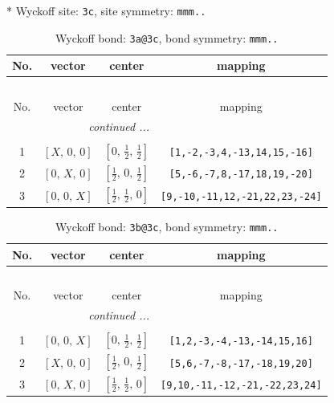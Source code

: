 \documentclass[fleqn,8pt]{jsarticle}
\begin{document}
* Wyckoff site: {\tt 3c}, site symmetry: {\tt mmm..}
\renewcommand{\arraystretch}{1.2}
\begin{longtable}{cccc}
\caption{Wyckoff bond: {\tt 3a@3c}, bond symmetry: {\tt mmm..}}
 \\
 \hline \hline
No. & vector & center & mapping \\ \hline \endfirsthead

\multicolumn{3}{l}{\tablename\ \thetable{}} \\
 \hline \hline
No. & vector & center & mapping \\ \hline \endhead

 \hline \hline
\multicolumn{3}{r}{\footnotesize\it continued ...} \\ \endfoot

 \hline \hline
\multicolumn{3}{r}{} \\ \endlastfoot

1 & $\left[ X,\, 0,\, 0 \right]$ & $\left[ 0,\, \frac{1}{2},\, \frac{1}{2} \right]$ & {\tt [1,-2,-3,4,-13,14,15,-16]} \\ \hline
2 & $\left[ 0,\, X,\, 0 \right]$ & $\left[ \frac{1}{2},\, 0,\, \frac{1}{2} \right]$ & {\tt [5,-6,-7,8,-17,18,19,-20]} \\ \hline
3 & $\left[ 0,\, 0,\, X \right]$ & $\left[ \frac{1}{2},\, \frac{1}{2},\, 0 \right]$ & {\tt [9,-10,-11,12,-21,22,23,-24]} \\
\end{longtable}
\renewcommand{\arraystretch}{1.2}
\begin{longtable}{cccc}
\caption{Wyckoff bond: {\tt 3b@3c}, bond symmetry: {\tt mmm..}}
 \\
 \hline \hline
No. & vector & center & mapping \\ \hline \endfirsthead

\multicolumn{3}{l}{\tablename\ \thetable{}} \\
 \hline \hline
No. & vector & center & mapping \\ \hline \endhead

 \hline \hline
\multicolumn{3}{r}{\footnotesize\it continued ...} \\ \endfoot

 \hline \hline
\multicolumn{3}{r}{} \\ \endlastfoot

1 & $\left[ 0,\, 0,\, X \right]$ & $\left[ 0,\, \frac{1}{2},\, \frac{1}{2} \right]$ & {\tt [1,2,-3,-4,-13,-14,15,16]} \\ \hline
2 & $\left[ X,\, 0,\, 0 \right]$ & $\left[ \frac{1}{2},\, 0,\, \frac{1}{2} \right]$ & {\tt [5,6,-7,-8,-17,-18,19,20]} \\ \hline
3 & $\left[ 0,\, X,\, 0 \right]$ & $\left[ \frac{1}{2},\, \frac{1}{2},\, 0 \right]$ & {\tt [9,10,-11,-12,-21,-22,23,24]} \\
\end{longtable}
\end{document}
